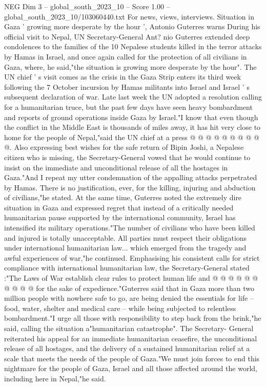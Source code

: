 \begin{textsample}{NEG Dim 3 – global\_south\_2023\_10 – Score 1.00 – global\_south\_2023\_10/103060440.txt}  \label{ex:f3_neg_029}
For news, views, interviews.
Situation in Gaza ' growing more desperate by the hour ', Antonio Guterres warns During his official visit to Nepal, UN Secretary-General Ant? nio Guterres extended deep condolences to the families of the 10 Nepalese students killed in the terror attacks by Hamas in Israel, and once again called for the protection of all civilians in Gaza, where, he said,"the situation is growing more desperate by the hour".
The UN chief ' s visit comes as the crisis in the Gaza Strip enters its third week following the 7 October incursion by Hamas militants into Israel and Israel ' s subsequent declaration of war.
Late last week the UN adopted a resolution calling for a humanitarian truce, but the past few days have seen heavy bombardment and reports of ground operations inside Gaza by Israel."I know that even though the conflict in the Middle East is thousands of miles away, it has hit very close to home for the people of Nepal,"said the UN chief at a press @ @ @ @ @ @ @ @ @ @.
Also expressing best wishes for the safe return of Bipin Joshi, a Nepalese citizen who is missing, the Secretary-General vowed that he would continue to insist on the immediate and unconditional release of all the hostages in Gaza."And I repeat my utter condemnation of the appalling attacks perpetrated by Hamas.
There is no justification, ever, for the killing, injuring and abduction of civilians,"he stated.
At the same time, Guterres noted the extremely dire situation in Gaza and expressed regret that instead of a critically needed humanitarian pause supported by the international community, Israel has intensified its military operations."The number of civilians who have been killed and injured is totally unacceptable.
All parties must respect their obligations under international humanitarian law... which emerged from the tragedy and awful experiences of war,"he continued.
Emphasising his consistent calls for strict compliance with international humanitarian law, the Secretary-General stated :"The Laws of War establish clear rules to protect human life and @ @ @ @ @ @ @ @ @ @ for the sake of expedience."Guterres said that in Gaza more than two million people with nowhere safe to go, are being denied the essentials for life -- food, water, shelter and medical care -- while being subjected to relentless bombardment."I urge all those with responsibility to step back from the brink,"he said, calling the situation a"humanitarian catastrophe".
The Secretary- General reiterated his appeal for an immediate humanitarian ceasefire, the unconditional release of all hostages, and the delivery of a sustained humanitarian relief at a scale that meets the needs of the people of Gaza."We must join forces to end this nightmare for the people of Gaza, Israel and all those affected around the world, including here in Nepal,"he said.

\end{textsample}
